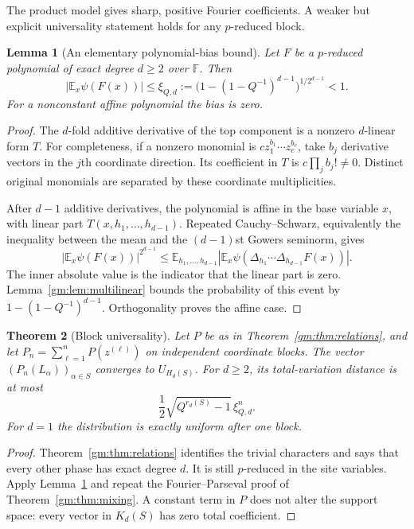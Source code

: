 \documentclass[11pt,a4paper]{article}
\numberwithin{equation}{section}
\newtheorem{theorem}{Theorem}[section]
\newtheorem{lemma}[theorem]{Lemma}
\theoremstyle{definition}
\theoremstyle{remark}
\newcommand{\F}{\mathbb F}
\newcommand{\E}{\mathbb E}
\newcommand{\1}{\mathbf 1}
\begin{document}
The product model gives sharp, positive Fourier coefficients. A weaker
but explicit universality statement holds for any $p$-reduced block.

\begin{lemma}[An elementary polynomial-bias bound]
\label{gm:lem:polynomial-bias}
Let $F$ be a $p$-reduced polynomial of exact degree $d\geq2$ over $\F$.
Then
\begin{equation}\label{gm:eq:xi}
 \left|\E_x\psi(F(x))\right|
 \leq \xi_{Q,d}:=
 \bigl(1-(1-Q^{-1})^{d-1}\bigr)^{1/2^{d-1}}<1.
\end{equation}
For a nonconstant affine polynomial the bias is zero.
\end{lemma}

\begin{proof}
The $d$-fold additive derivative of the top component is a nonzero
$d$-linear form $T$. For completeness, if a nonzero monomial is
$c z_1^{b_1}\cdots z_e^{b_e}$, take $b_j$ derivative vectors in the $j$th
coordinate direction. Its coefficient in $T$ is
$c\prod_j b_j!\ne0$. Distinct original monomials are separated by these
coordinate multiplicities.

After $d-1$ additive derivatives, the polynomial is affine in the base
variable $x$, with linear part $T(x,h_1,\ldots,h_{d-1})$. Repeated
Cauchy--Schwarz, equivalently the inequality between the mean and the
$(d-1)$st Gowers seminorm, gives
\[
 \left|\E_x\psi(F(x))\right|^{2^{d-1}}
 \leq \E_{h_1,\ldots,h_{d-1}}
       \left|\E_x\psi(\Delta_{h_1}\cdots\Delta_{h_{d-1}}F(x))\right|.
\]
The inner absolute value is the indicator that the linear part is zero.
Lemma~\ref{gm:lem:multilinear} bounds the probability of this event by
$1-(1-Q^{-1})^{d-1}$. Orthogonality proves the affine case.
\end{proof}

\begin{theorem}[Block universality]\label{gm:thm:universality}
Let $P$ be as in Theorem~\ref{gm:thm:relations}, and let
$P_n=\sum_{\ell=1}^n P(z^{(\ell)})$ on independent coordinate blocks.
The vector $(P_n(L_\alpha))_{\alpha\in S}$ converges to $U_{H_d(S)}$.
For $d\geq2$, its total-variation distance is at most
\[
 \frac12\sqrt{Q^{r_d(S)}-1}\,\xi_{Q,d}^n.
\]
For $d=1$ the distribution is exactly uniform after one block.
\end{theorem}

\begin{proof}
Theorem~\ref{gm:thm:relations} identifies the trivial characters and says
that every other phase has exact degree $d$. It is still $p$-reduced in
the site variables. Apply Lemma~\ref{gm:lem:polynomial-bias} and repeat the
Fourier--Parseval proof of Theorem~\ref{gm:thm:mixing}. A constant term in
$P$ does not alter the support space: every vector in $K_d(S)$ has zero
total coefficient.
\end{proof}
\end{document}
